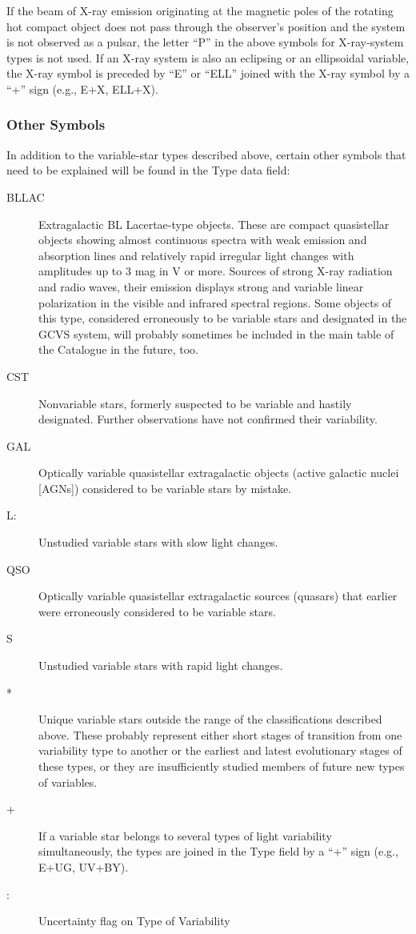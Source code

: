 If the beam of X-ray emission originating at the magnetic poles of the
rotating hot compact object does not pass through the observer's
position and the system is not observed as a pulsar, the letter ``P'' in
the above symbols for X-ray-system types is not used. If an X-ray
system is also an eclipsing or an ellipsoidal variable, the X-ray symbol
is preceded by ``E'' or ``ELL'' joined with the X-ray symbol by a ``+''
sign (e.g., E+X, ELL+X).

\subsubsection{Other Symbols}\label{other-symbols}

In addition to the variable-star types described above, certain other
symbols that need to be explained will be found in the Type data field:

\begin{description}
\item[BLLAC] Extragalactic BL Lacertae-type objects. These are
             compact quasistellar objects showing almost continuous spectra with weak
             emission and absorption lines and relatively rapid irregular light
             changes with amplitudes up to 3 mag in V or more. Sources of strong
             X-ray radiation and radio waves, their emission displays strong and
             variable linear polarization in the visible and infrared spectral
             regions. Some objects of this type, considered erroneously to be
             variable stars and designated in the GCVS system, will probably
             sometimes be included in the main table of the Catalogue in the future, too.
\item[CST]   Nonvariable stars, formerly suspected to be variable and
             hastily designated. Further observations have not confirmed their variability.
\item[GAL]   Optically variable quasistellar extragalactic objects
             (active galactic nuclei {[}AGNs{]}) considered to be variable stars by mistake.
\item[L:]    Unstudied variable stars with slow light changes.
\item[QSO]   Optically variable quasistellar extragalactic sources
             (quasars) that earlier were erroneously considered to be variable stars.
\item[S]     Unstudied variable stars with rapid light changes.
\item[*]     Unique variable stars outside the range of the
             classifications described above. These probably represent either short
             stages of transition from one variability type to another or the
             earliest and latest evolutionary stages of these types, or they are
             insufficiently studied members of future new types of variables.
\item[+]     If a variable star belongs to several types of light
             variability simultaneously, the types are joined in the Type field by a
             ``+'' sign (e.g., E+UG, UV+BY).
\item[:]     Uncertainty flag on Type of Variability
\end{description}

